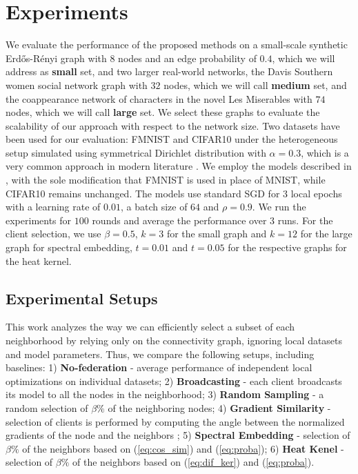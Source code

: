 \documentclass[journal]{IEEEtran}
\begin{document}
\vspace{-0.4 cm}
\section{Experiments}
\label{sec:exper}

We evaluate the performance of the proposed methods on a small-scale synthetic Erdős-Rényi graph \cite{random_graph} with 8 nodes and an edge probability of $0.4$, which we will address as \textbf{small} set, and two larger real-world networks, the Davis Southern women social network graph \cite{south_graph} with $32$ nodes, which we will call \textbf{medium} set, and the coappearance network of characters in the novel Les Miserables \cite{miserable_graph} with $74$ nodes, which we will call \textbf{large} set. We select these graphs to evaluate the scalability of our approach with respect to the network size. Two datasets have been used for our evaluation: FMNIST and CIFAR10 under the heterogeneous setup simulated using symmetrical Dirichlet distribution with $\alpha=0.3$, which is a very common approach in modern literature \cite{dir}. We employ the models described in \cite{FL}, with the sole modification that FMNIST is used in place of MNIST, while CIFAR10 remains unchanged. The models use standard SGD for $3$ local epochs with a learning rate of $0.01$, a batch size of $64$ and $\rho=0.9$. We run the experiments for $100$ rounds and average the performance over $3$ runs. For the client selection, we use $\beta=0.5$, $k=3$ for the small graph and $k=12$ for the large graph for spectral embedding, $t=0.01$ and $t=0.05$ for the respective graphs for the heat kernel.  

\vspace{-0.4 cm}
\subsection{Experimental Setups}
This work analyzes the way we can efficiently select a subset of each neighborhood by relying only on the connectivity graph, ignoring local datasets and model parameters. Thus, we compare the following setups, including baselines: 1) \textbf{No-federation} - average performance of independent local optimizations on individual datasets; 2) \textbf{Broadcasting} - each client broadcasts its model to all the nodes in the neighborhood; 3) \textbf{Random Sampling} - a random selection of $\beta \%$ of the neighboring nodes; 4) \textbf{Gradient Similarity} - selection of clients is performed by computing the angle between the normalized gradients of the node and the neighbors \cite{client_GRAD_sampling}; 5) \textbf{Spectral Embedding} - selection of $\beta \%$ of the neighbors based on (\ref{eq:cos_sim}) and (\ref{eq:proba}); 6) \textbf{Heat Kenel} - selection of $\beta \%$ of the neighbors based on (\ref{eq:dif_ker}) and (\ref{eq:proba}).
\vspace{-0.4 cm}
\end{document}
